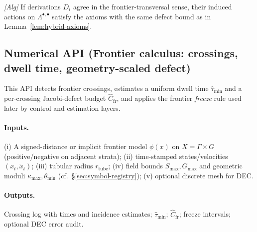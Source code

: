 \begin{proposition}\label{prop:graph-deriv}
\emph{[\textup{Alg}]} If derivations $D_i$ agree in the frontier-transversal sense, their induced actions on $\Lambda^{\bullet,\bullet}$ satisfy the axioms with the same defect bound as in Lemma~\ref{lem:hybrid-axioms}.
\end{proposition}

\subsection*{Numerical API (Frontier calculus: crossings, dwell time, geometry-scaled defect)}
\emph{} This API detects frontier crossings, estimates a uniform dwell time $\widehat{\tau}_{\min}$ and a per-crossing Jacobi-defect budget $\widehat{C}_{\mathrm{fr}}$, and applies the frontier \emph{freeze} rule used later by control and estimation layers.

\paragraph{Inputs.}
(i) A signed-distance or implicit frontier model $\phi(x)$ on $X=\Gamma\times G$ (positive/negative on adjacent strata);  
(ii) time-stamped states/velocities $(x_t,\dot{x}_t)$;  
(iii) tubular radius $r_{\mathrm{tube}}$; (iv) field bounds $S_{\max},G_{\max}$ and geometric moduli $\kappa_{\max},\theta_{\min}$ (cf.\ \S\ref{sec:symbol-registry});  
(v) optional discrete mesh for DEC.

\paragraph{Outputs.}
Crossing log with times and incidence estimates; $\widehat{\tau}_{\min}$; $\widehat{C}_{\mathrm{fr}}$; freeze intervals; optional DEC error audit.

